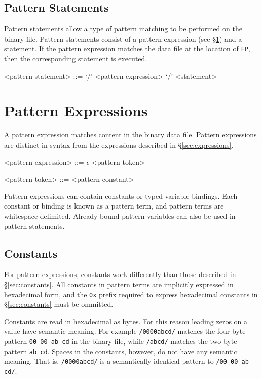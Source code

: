 \documentclass[letterpaper]{article}
\begin{document}
\subsection{Pattern Statements}
Pattern statements allow a type of pattern matching to be performed on the binary file.  Pattern statements consist of a pattern expression (see \S\ref{sec:pattern-expressions}) and a statement.  If the pattern expression matches the data file at the location of \texttt{FP}, then the corresponding statement is executed.
\begin{grammar}
<pattern-statement> ::= `/' <pattern-expression> `/' <statement>
\end{grammar}

\section{Pattern Expressions}
\label{sec:pattern-expressions}
A pattern expression matches content in the binary data file.  Pattern expressions are distinct in syntax from the expressions described in \S\ref{sec:expressions}.

\begin{grammar}
<pattern-expression> ::= $\epsilon$
 <pattern-token>

<pattern-token> ::= <pattern-constant>
\end{grammar}

Pattern expressions can contain constants or typed variable bindings.  Each constant or binding is known as a pattern term, and pattern terms are whitespace delimited.  Already bound pattern variables can also be used in pattern statements.

\subsection{Constants}
\label{sec:pattern-constants}
For pattern expressions, constants work differently than those described in \S\ref{sec:constants}.  All constants in pattern terms are implicitly expressed in hexadecimal form, and the \texttt{0x} prefix required to express hexadecimal constants in \S\ref{sec:constants} must be ommitted.

Constants are read in hexadecimal as bytes.  For this reason leading zeros on a value have semantic meaning.  For example \texttt{/0000abcd/} matches the four byte pattern \texttt{00 00 ab cd} in the binary file, while \texttt{/abcd/} matches the two byte pattern \texttt{ab cd}.  Spaces in the constants, however, do not have any semantic meaning.  That is, \texttt{/0000abcd/} is a semantically identical pattern to \texttt{/00 00 ab cd/}.
 
\end{document}
